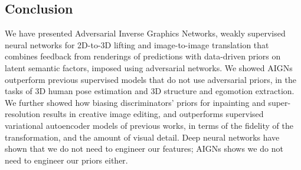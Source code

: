 \documentclass[10pt,twocolumn,letterpaper]{article}
\begin{document}
\begin{bibunit}[ieee]
\section{Conclusion}
We have presented Adversarial Inverse Graphics Networks, weakly supervised neural networks for 2D-to-3D lifting and image-to-image translation that combines feedback from  renderings of predictions with data-driven priors on  latent semantic factors, imposed using adversarial networks. %
We showed AIGNs outperform  previous supervised models that do not use adversarial priors, in the tasks of 3D human pose estimation and  3D structure and egomotion extraction. We further showed how biasing discriminators' priors  for inpainting and super-resolution results in creative image editing, and outperforms supervised variational autoencoder models of previous works, in terms of the fidelity of the transformation, and the amount of visual detail. Deep neural networks have shown that we do not need to engineer our features; AIGNs shows we do not need to engineer our priors either.
\begin{comment}
We have presented a weakly supervised  inverse model of images that predicts imaginations of hidden representations which then renders through image formation or layering to reconstruct the original image. 
It regularizes the inferred hidden representations using  convolutional adversarial priors by distribution matching against retrieved relevant memories.
It does not assume paired supervision and can handle multimodal imagination spaces. 
We have empirically validated are design choices of %
fully-convolutional adversarial discriminator networks and  relevant memory retrieval. We believe the proposed learning paradigm better exploits unlabelled data in the form of images, depth maps, albedo, shading or segmentation maps and complements well human paired annotations. 

\end{comment}
\end{bibunit}
\end{document}
